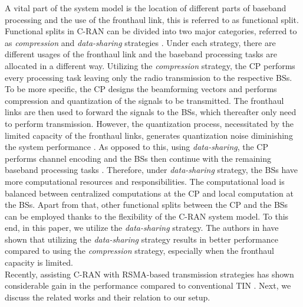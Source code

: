 \documentclass[12pt,draftcls,onecolumn]{IEEEtran}
\theoremstyle{remark}
\theoremstyle{definition}
\begin{document}
A vital part of the system model is the location of different parts of baseband processing and the use of the fronthaul link, this is referred to as functional split. Functional splits in C-RAN can be divided into two major categories, referred to as \emph{compression} and \emph{data-sharing} strategies \cite{97813165296}. Under each strategy, there are different usages of the fronthaul link and the baseband processing tasks are allocated in a different way. Utilizing the \emph{compression} strategy, the CP performs every processing task leaving only the radio transmission to the respective BSs. To be more specific, the CP designs the beamforming vectors and performs compression and quantization of the signals to be transmitted. The fronthaul links are then used to forward the signals to the BSs, which thereafter only need to perform transmission. However, the quantization process, necessitated by the limited capacity of the fronthaul links, generates quantization noise diminishing the system performance \cite{6588350}.
As opposed to this, using \emph{data-sharing}, the CP performs channel encoding and the BSs then continue with the remaining baseband processing tasks \cite{DaiY14}. Therefore, under \emph{data-sharing} strategy, the BSs have more computational resources and responsibilities. The computational load is balanced between centralized computations at the CP and local computation at the BSs.
Apart from that, other functional splits between the CP and the BSs can be employed thanks to the flexibility of the C-RAN system model. To this end, in this paper, we utilize the \emph{data-sharing} strategy. %
The authors in \cite{7809154} have shown that utilizing the \emph{data-sharing} strategy results in better performance compared to using the \emph{compression} strategy, especially when the fronthaul capacity is limited. \\
\indent Recently, assisting C-RAN with RSMA-based transmission strategies has shown considerable gain in the performance compared to conventional TIN \cite{9145076,8732995,ahmad2020rate,9145363}. Next, we discuss the related works and their relation to our setup.
\end{document}
